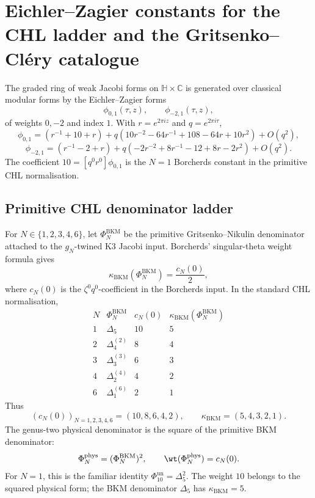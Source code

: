 \providecommand{\ZZ}{\mathbb{Z}}
\providecommand{\HH}{\mathbb{H}}
\providecommand{\kBKM}{\kappa_{\mathrm{BKM}}}
\providecommand{\kch}{\kappa_{\mathrm{ch}}}
\providecommand{\kcat}{\kappa_{\mathrm{cat}}}
\providecommand{\Sp}{\mathrm{Sp}}
\providecommand{\EZ}{\mathrm{EZ}}

\section*{Eichler--Zagier constants for the CHL ladder and the
Gritsenko--Cl\'ery catalogue}

The graded ring of weak Jacobi forms on \(\HH\times\mathbb{C}\) is
generated over classical modular forms by the Eichler--Zagier forms
\[
  \phi_{0,1}(\tau,z),\qquad \phi_{-2,1}(\tau,z),
\]
of weights \(0,-2\) and index \(1\).  With
\(r=e^{2\pi i z}\) and \(q=e^{2\pi i\tau}\),
\[
  \phi_{0,1}=(r^{-1}+10+r)
  +q(10r^{-2}-64r^{-1}+108-64r+10r^2)+O(q^2),
\]
\[
  \phi_{-2,1}=(r^{-1}-2+r)
  +q(-2r^{-2}+8r^{-1}-12+8r-2r^2)+O(q^2).
\]
The coefficient \(10=[q^0r^0]\phi_{0,1}\) is the \(N=1\) Borcherds
constant in the primitive CHL normalisation.

\subsection*{Primitive CHL denominator ladder}

For \(N\in\{1,2,3,4,6\}\), let \(\Phi_N^{\mathrm{BKM}}\) be the
primitive Gritsenko--Nikulin denominator attached to the
\(g_N\)-twined K3 Jacobi input.  Borcherds' singular-theta weight
formula gives
\[
  \kBKM(\Phi_N^{\mathrm{BKM}})=\frac{c_N(0)}{2},
\]
where \(c_N(0)\) is the \(\zeta^0q^0\)-coefficient in the Borcherds
input.  In the standard CHL normalisation,
\[
\begin{array}{c|c|c|c}
N & \Phi_N^{\mathrm{BKM}} & c_N(0) & \kBKM(\Phi_N^{\mathrm{BKM}})\\
\hline
1 & \Delta_5 & 10 & 5\\
2 & \Delta_4^{(2)} & 8 & 4\\
3 & \Delta_3^{(3)} & 6 & 3\\
4 & \Delta_2^{(4)} & 4 & 2\\
6 & \Delta_1^{(6)} & 2 & 1
\end{array}
\]
Thus
\[
  (c_N(0))_{N=1,2,3,4,6}=(10,8,6,4,2),\qquad
  \kBKM=(5,4,3,2,1).
\]
The genus-two physical denominator is the square of the primitive
BKM denominator:
\[
  \Phi_N^{\mathrm{phys}}=(\Phi_N^{\mathrm{BKM}})^2,\qquad
  \wt(\Phi_N^{\mathrm{phys}})=c_N(0).
\]
For \(N=1\), this is the familiar identity
\(\Phi_{10}^{\mathrm{un}}=\Delta_5^2\).  The weight \(10\) belongs to
the squared physical form; the BKM denominator \(\Delta_5\) has
\(\kBKM=5\).


